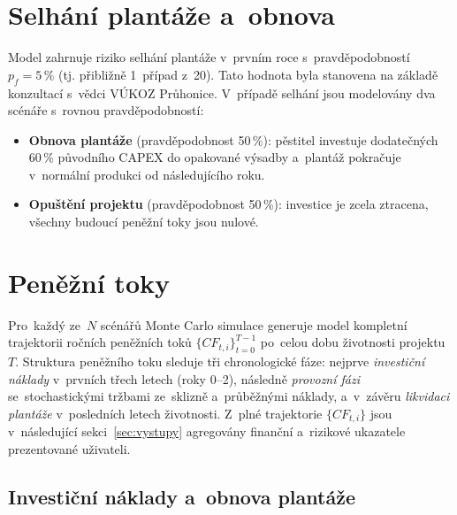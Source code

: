 \section{Selhání plantáže a~obnova}
\label{sec:selhani}

Model zahrnuje riziko selhání plantáže v~prvním roce s~pravděpodobností $p_f = 5\,\%$ (tj. přibližně 1~případ z~20). Tato hodnota byla stanovena na základě konzultací s~vědci VÚKOZ Průhonice. V~případě selhání jsou modelovány dva scénáře s~rovnou pravděpodobností:
\begin{itemize}
  \item \textbf{Obnova plantáže} (pravděpodobnost 50\,\%): pěstitel investuje dodatečných 60\,\% původního CAPEX do opakované výsadby a~plantáž pokračuje v~normální produkci od následujícího roku.
  \item \textbf{Opuštění projektu} (pravděpodobnost 50\,\%): investice je zcela ztracena, všechny budoucí peněžní toky jsou nulové.
\end{itemize}


\section{Peněžní toky}
\label{sec:cash_flow}

Pro~každý ze~$N$ scénářů Monte Carlo simulace generuje model kompletní
trajektorii ročních peněžních toků $\{CF_{t,i}\}_{t=0}^{T-1}$ po~celou
dobu životnosti projektu $T$. Struktura peněžního toku sleduje tři
chronologické fáze: nejprve \emph{investiční náklady} v~prvních třech
letech (roky 0--2), následně \emph{provozní fázi} se~stochastickými
tržbami ze~sklizně a~průběžnými náklady, a~v~závěru \emph{likvidaci
plantáže} v~posledních letech životnosti. Z~plné trajektorie
$\{CF_{t,i}\}$ jsou v~následující sekci~\ref{sec:vystupy} agregovány
finanční a~rizikové ukazatele prezentované uživateli.

\subsection{Investiční náklady a~obnova plantáže}
\label{subsec:cf_capex}

